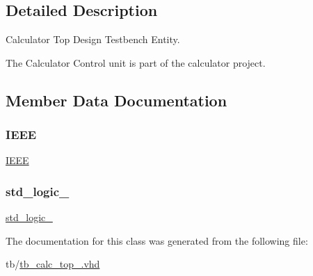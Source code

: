 \subsection{Detailed Description}
Calculator Top Design Testbench Entity. 

The Calculator Control unit is part of the calculator project. 

\subsection{Member Data Documentation}
\mbox{\label{classtb__calc__top_ae4f03c286607f3181e16b9aa12d0c6d4}} 
\subsubsection{\texorpdfstring{I\+E\+EE}{IEEE}}
{\footnotesize\ttfamily \hyperlink{classtb__calc__top_ae4f03c286607f3181e16b9aa12d0c6d4}{I\+E\+EE}\hspace{0.3cm}{\ttfamily [Library]}}

\mbox{\label{classtb__calc__top_acd03516902501cd1c7296a98e22c6fcb}} 
\subsubsection{\texorpdfstring{std\+\_\+logic\+\_}{std\_logic\_1164}}
{\footnotesize\ttfamily \hyperlink{classtb__calc__top_acd03516902501cd1c7296a98e22c6fcb}{std\+\_\+logic\+\_}\hspace{0.3cm}{\ttfamily [Package]}}



The documentation for this class was generated from the following file\+:\begin{DoxyCompactItemize}
\item 
tb/\hyperlink{tb__calc__top___8vhd}{tb\+\_\+calc\+\_\+top\+\_\+.\+vhd}\end{DoxyCompactItemize}
